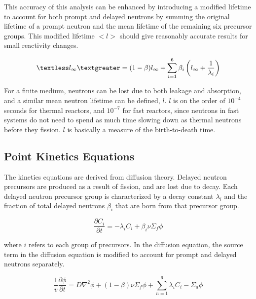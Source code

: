 \documentclass[10pt]{article}
\newcommand{\beq}{\begin{equation}}
\newcommand{\eeq}{\end{equation}}
\begin{document}
\begin{flushleft}
This accuracy of this analysis can be enhanced by introducing a modified lifetime to account for both prompt and delayed neutrons by summing the original lifetime of a prompt neutron and the mean lifetime of the remaining six precursor groups. This modified lifetime \(<l>\) should give reasonably accurate results for small reactivity changes. 

\beq
\label{eq:AdjustedLifetime}
\textless l_\infty\textgreater=(1-\beta)l_\infty+\sum_{i=1}^{6} \beta_i\left(l_\infty+\frac{1}{\lambda_i}\right)
\eeq

For a finite medium, neutrons can be lost due to both leakage and absorption, and a similar mean neutron lifetime can be defined, \(l\). \(l\) is on the order of \(10^{-4}\) seconds for thermal reactors, and \(10^{-7}\) for fast reactors, since neutrons in fast systems do not need to spend as much time slowing down as thermal neutrons before they fission. \(l\) is basically a measure of the birth-to-death time.

\subsection{Point Kinetics Equations}
The kinetics equations are derived from diffusion theory. Delayed neutron precursors are produced as a result of fission, and are lost due to decay. Each delayed neutron precursor group is characterized by a decay constant \(\lambda_i\) and the fraction of total delayed neutrons \(\beta_i\) that are born from that precursor group.

\beq
\label{eq:PrecursorEquationKinetics}
\frac{\partial C_i}{\partial t}=-\lambda_i C_i + \beta_i \nu\Sigma_f\phi
\eeq

where \(i\) refers to each group of precursors. In the diffusion equation, the source term in the diffusion equation is modified to account for prompt and delayed neutrons separately.

\beq
\label{eq:NeutronEquationKinetics}
\frac{1}{v}\frac{\partial\phi}{\partial t}=D\nabla^2\phi + (1-\beta)\nu\Sigma_f\phi + \sum_{n=1}^{6} \lambda_i C_i -\Sigma_a\phi
\eeq


\end{flushleft}
\end{document}
